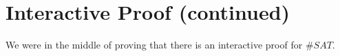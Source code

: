 




\section*{Interactive Proof (continued)}

We were in the middle of proving that there is an interactive proof for $\#SAT$.
